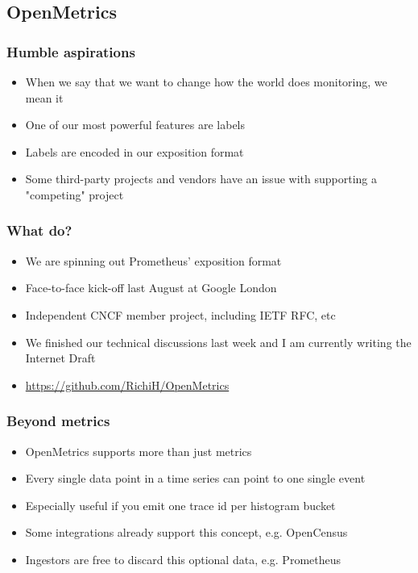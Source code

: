 \documentclass[t]{beamer}
\begin{document}
\subsection{OpenMetrics}

\begin{frame}
	\frametitle{Humble aspirations}
	\begin{itemize}
		\item When we say that we want to change how the world does monitoring, we mean it
		\item One of our most powerful features are labels
		\item Labels are encoded in our exposition format
		\item Some third-party projects and vendors have an issue with supporting a "competing" project
	\end{itemize}
\end{frame}

\begin{frame}
	\frametitle{What do?}
	\begin{itemize}
		\item We are spinning out Prometheus' exposition format
		\item Face-to-face kick-off last August at Google London
		\item Independent CNCF member project, including IETF RFC, etc
		\item We finished our technical discussions last week and I am currently writing the Internet Draft
		\item \url{https://github.com/RichiH/OpenMetrics}
	\end{itemize}
\end{frame}

\begin{frame}
	\frametitle{Beyond metrics}
	\begin{itemize}
		\item OpenMetrics supports more than just metrics
		\item Every single data point in a time series can point to one single event
		\item Especially useful if you emit one trace id per histogram bucket
		\item Some integrations already support this concept, e.g. OpenCensus
		\item Ingestors are free to discard this optional data, e.g. Prometheus
	\end{itemize}
\end{frame}
\end{document}
